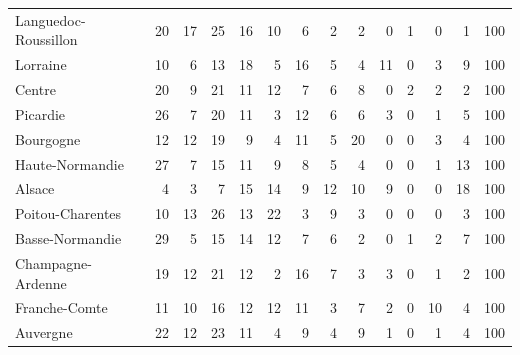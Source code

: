 \documentclass[11pt]{article}
\begin{document}
\begin{table}[H]
\begin{tabular}{lrrrrrrrrrrrrr}
Languedoc-Roussillon &         20 &         17 &         25 &         16 &         10 &          6 &          2 &          2 &          0 &          1 &          0 &          1 &        100 \\
Lorraine             &         10 &          6 &         13 &         18 &          5 &         16 &          5 &          4 &         11 &          0 &          3 &          9 &        100 \\
Centre               &         20 &          9 &         21 &         11 &         12 &          7 &          6 &          8 &          0 &          2 &          2 &          2 &        100 \\
Picardie             &         26 &          7 &         20 &         11 &          3 &         12 &          6 &          6 &          3 &          0 &          1 &          5 &        100 \\
Bourgogne            &         12 &         12 &         19 &          9 &          4 &         11 &          5 &         20 &          0 &          0 &          3 &          4 &        100 \\
Haute-Normandie      &         27 &          7 &         15 &         11 &          9 &          8 &          5 &          4 &          0 &          0 &          1 &         13 &        100 \\
Alsace               &          4 &          3 &          7 &         15 &         14 &          9 &         12 &         10 &          9 &          0 &          0 &         18 &        100 \\
Poitou-Charentes     &         10 &         13 &         26 &         13 &         22 &          3 &          9 &          3 &          0 &          0 &          0 &          3 &        100 \\
Basse-Normandie      &         29 &          5 &         15 &         14 &         12 &          7 &          6 &          2 &          0 &          1 &          2 &          7 &        100 \\
Champagne-Ardenne    &         19 &         12 &         21 &         12 &          2 &         16 &          7 &          3 &          3 &          0 &          1 &          2 &        100 \\
Franche-Comte        &         11 &         10 &         16 &         12 &         12 &         11 &          3 &          7 &          2 &          0 &         10 &          4 &        100 \\
Auvergne             &         22 &         12 &         23 &         11 &          4 &          9 &          4 &          9 &          1 &          0 &          1 &          4 &        100 \\

\end{tabular}
\end{table}
\end{document}
